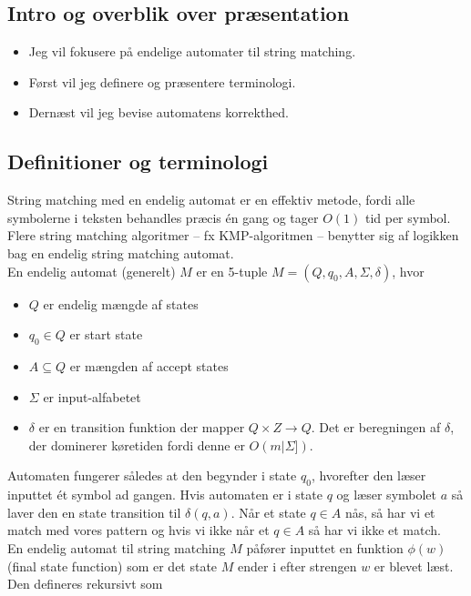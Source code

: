\documentclass[12pt]{article}
\begin{document}
\subsection*{Intro og overblik over præsentation}

\begin{itemize}
    \item Jeg vil fokusere på endelige automater til string matching. 
    \item Først vil jeg definere og præsentere terminologi.
    \item Dernæst vil jeg bevise automatens korrekthed. 
\end{itemize}

\subsection*{Definitioner og terminologi}

String matching med en endelig automat er en effektiv metode, fordi alle symbolerne i teksten behandles præcis én gang og tager $O(1)$ tid per symbol. Flere string matching algoritmer -- fx KMP-algoritmen -- benytter sig af logikken bag en endelig string matching automat. \\

En endelig automat (generelt) $M$ er en 5-tuple $M=(Q,q_0, A, \Sigma, \delta)$, hvor 

\begin{itemize}
    \item $Q$ er endelig mængde af states
    \item $q_0 \in Q$ er start state 
    \item $A \subseteq Q$ er mængden af accept states
    \item $\Sigma$ er input-alfabetet
    \item $\delta$ er en transition funktion der mapper $Q \times Z \rightarrow Q$. Det er beregningen af $\delta$, der dominerer køretiden fordi denne er $O(m |\Sigma])$.
\end{itemize}

Automaten fungerer således at den begynder i state $q_0$, hvorefter den læser inputtet ét symbol ad gangen. Hvis automaten er i state $q$ og læser symbolet $a$ så laver den en state transition til $\delta(q,a)$. Når et state $q \in A$ nås, så har vi et match med vores pattern og hvis vi ikke når et $q \in A$ så har vi ikke et match. \\

En endelig automat til string matching $M$ påfører inputtet en funktion $\phi(w)$ (final state function) som er det state $M$ ender i efter strengen $w$ er blevet læst. Den defineres rekursivt som
\end{document}
